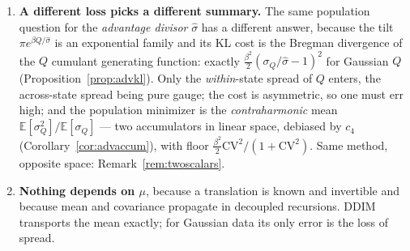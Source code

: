 \documentclass[11pt]{article}
\theoremstyle{definition}
\newcommand{\E}{\mathbb{E}}
\begin{document}
\begin{enumerate}
  (Proposition~\ref{prop:selfsim}), the substitution costs exactly $\cosh\Delta$
  with $\Delta$ the odd-cumulant sum \eqref{eq:oddcum} --- negligible for
  moderate skew, comparable to the floor for strong skew, and cheap to measure
  rather than assume (Remark~\ref{rem:measuredelta}). A per-state shift should
  shrink toward the global one with weight $\tau^2/(\tau^2+\kappa(\nu))$, which is
  never worse than either extreme.
  \item \textbf{A different loss picks a different summary.} The same
  population question for the \emph{advantage divisor} $\hat\sigma$ has a
  different answer, because the tilt $\pi e^{\beta Q/\hat\sigma}$ is an
  exponential family and its KL cost is the Bregman divergence of the $Q$
  cumulant generating function: exactly $\tfrac{\beta^2}{2}(\sigma_Q/\hat\sigma-1)^2$
  for Gaussian $Q$ (Proposition~\ref{prop:advkl}). Only the \emph{within}-state
  spread of $Q$ enters, the across-state spread being pure gauge; the cost is
  asymmetric, so one must err high; and the population minimizer is the
  \emph{contraharmonic} mean $\E[\sigma_Q^2]/\E[\sigma_Q]$ --- two accumulators in
  linear space, debiased by $c_4$ (Corollary~\ref{cor:advaccum}), with floor
  $\tfrac{\beta^2}{2}\mathrm{CV}^2/(1+\mathrm{CV}^2)$. Same method, opposite space:
  Remark~\ref{rem:twoscalars}.
  \item \textbf{Nothing depends on $\mu$}, because a translation is known and
  invertible and because mean and covariance propagate in decoupled recursions.
  DDIM transports the mean exactly; for Gaussian data its only error is the loss
  of spread.
\end{enumerate}
\end{document}
